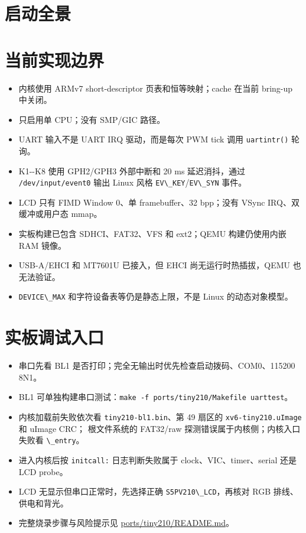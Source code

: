 \section{启动全景}\label{ux542fux52a8ux5168ux666f}



\section{当前实现边界}\label{ux5f53ux524dux5b9eux73b0ux8fb9ux754c}

\begin{itemize}
\tightlist
\item
  内核使用 ARMv7 short-descriptor 页表和恒等映射；cache 在当前 bring-up
  中关闭。
\item
  只启用单 CPU；没有 SMP/GIC 路径。
\item
  UART 输入不是 UART IRQ 驱动，而是每次 PWM tick 调用
  \passthrough{\lstinline!uartintr()!} 轮询。
\item
  K1-\/-K8 使用 GPH2/GPH3 外部中断和 20 ms 延迟消抖，通过
  \passthrough{\lstinline!/dev/input/event0!} 输出 Linux 风格
  \passthrough{\lstinline!EV\_KEY!}/\passthrough{\lstinline!EV\_SYN!}
  事件。
\item
  LCD 只有 FIMD Window 0、单 framebuffer、32 bpp；没有 VSync
  IRQ、双缓冲或用户态 mmap。
\item
  实板构建已包含 SDHCI、FAT32、VFS 和 ext2；QEMU 构建仍使用内嵌 RAM
  镜像。
\item
  USB-A/EHCI 和 MT7601U 已接入，但 EHCI 尚无运行时热插拔，QEMU
  也无法验证。
\item
  \passthrough{\lstinline!DEVICE\_MAX!} 和字符设备表等仍是静态上限，不是
  Linux 的动态对象模型。
\end{itemize}

\section{实板调试入口}\label{ux5b9eux677fux8c03ux8bd5ux5165ux53e3}

\begin{itemize}
\tightlist
\item
  串口先看 BL1 是否打印；完全无输出时优先检查启动拨码、COM0、115200
  8N1。
\item
  BL1
  可单独构建串口测试：\passthrough{\lstinline!make -f ports/tiny210/Makefile uarttest!}。
\item
  内核加载前失败依次看
  \passthrough{\lstinline!tiny210-bl1.bin!}、第 49 扇区的
  \passthrough{\lstinline!xv6-tiny210.uImage!} 和 uImage CRC；
  根文件系统的 FAT32/raw 探测错误属于内核侧；内核入口失败看
  \passthrough{\lstinline!\_entry!}。
\item
  进入内核后按 \passthrough{\lstinline!initcall:!} 日志判断失败属于
  clock、VIC、timer、serial 还是 LCD probe。
\item
  LCD 无显示但串口正常时，先选择正确
  \passthrough{\lstinline!S5PV210\_LCD!}，再核对 RGB 排线、供电和背光。
\item
  完整烧录步骤与风险提示见
  \href{../../../ports/tiny210/README.md}{ports/tiny210/README.md}。
\end{itemize}
